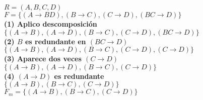 \documentclass[preview]{standalone}
\begin{document}
$R=(A,B,C,D)$\\
$F=\big\{(A\rightarrow BD), (B\rightarrow C), (C\rightarrow D), (BC\rightarrow D)\big\}$\\

\textbf{(1) Aplico descomposici\'on}\\
$\big\{(A\rightarrow B), (A\rightarrow D), (B\rightarrow C), (C\rightarrow D), (BC\rightarrow D)\big\}$\\

\textbf{(2) $B$ es redundante en $(BC\rightarrow D)$}\\
$\big\{(A\rightarrow B), (A\rightarrow D), (B\rightarrow C), (C\rightarrow D), (C\rightarrow D)\big\}$\\

\textbf{(3) Aparece dos veces $(C\rightarrow D)$}\\
$\big\{(A\rightarrow B), (A\rightarrow D), (B\rightarrow C), (C\rightarrow D)\big\}$\\

\textbf{(4) $(A\rightarrow D)$ es redundante}\\
$\big\{(A\rightarrow B), (B\rightarrow C), (C\rightarrow D)\big\}$\\

$F_m=\big\{(A\rightarrow B), (B\rightarrow C), (C\rightarrow D)\big\}$
\end{document}
